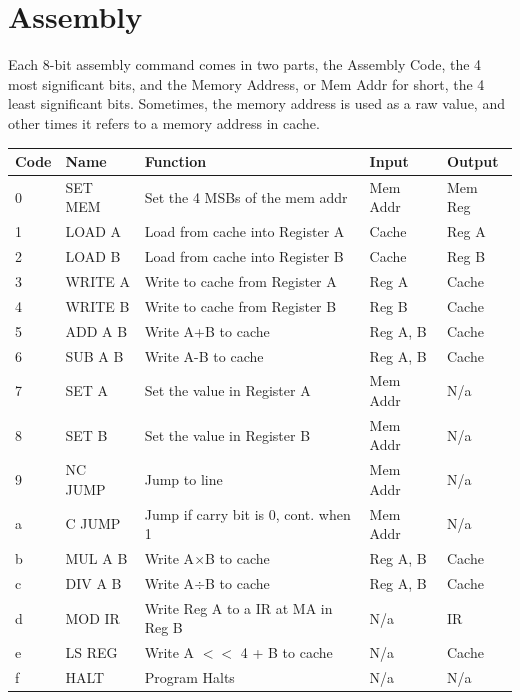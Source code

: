 \documentclass[12pt]{report}
\begin{document}
	\FloatBarrier

	

	\section{Assembly}
	
	Each 8-bit assembly command comes in two parts, the Assembly Code, the 4 most significant bits, and the Memory Address, or Mem Addr for short, the 4 least significant bits. Sometimes, the memory address is used as a raw value, and other times it refers to a memory address in cache.	\
	
	\FloatBarrier
	\begin{table}[!hbt]
		\centering
		\begin{tabular}{|l|l|l|l|l|}
			\hline
			Code 	& Name 		& Function 								& Input 	& Output 	\\ \hline
			0		& SET MEM	& Set the 4 MSBs of the mem addr		& Mem Addr	& Mem Reg 	\\ \hline
			1 		& LOAD A 	& Load from cache into Register A		& Cache 	& Reg A		\\ \hline
			2 		& LOAD B 	& Load from cache into Register B		& Cache 	& Reg B		\\ \hline
			3 		& WRITE A	& Write to cache from Register A		& Reg A 	& Cache		\\ \hline
			4 		& WRITE B	& Write to cache from Register B		& Reg B		& Cache		\\ \hline
			5 		& ADD A B	& Write A+B to cache					& Reg A, B	& Cache		\\ \hline
			6 		& SUB A B	& Write A-B to cache 					& Reg A, B	& Cache		\\ \hline
			7 		& SET A		& Set the value in Register A			& Mem Addr	& N/a		\\ \hline
			8 		& SET B		& Set the value in Register B			& Mem Addr	& N/a		\\ \hline
			9 		& NC JUMP	& Jump to line 							& Mem Addr	& N/a		\\ \hline
			a 		& C JUMP	& Jump if carry bit is 0, cont. when 1	& Mem Addr	& N/a		\\ \hline
			b 		& MUL A B	& Write A$\times$B to cache				& Reg A, B	& Cache		\\ \hline
			c 		& DIV A B	& Write A$\div$B to cache 				& Reg A, B	& Cache		\\ \hline
			d		& MOD IR	& Write Reg A to a IR at MA in Reg B	& N/a		& IR		\\ \hline
			e 		& LS REG	& Write A $<<$ 4 + B to cache			& N/a		& Cache		\\ \hline
			f 		& HALT		& Program Halts							& N/a		& N/a		\\ \hline
		\end{tabular}
	\end{table}
	\FloatBarrier
\end{document}
